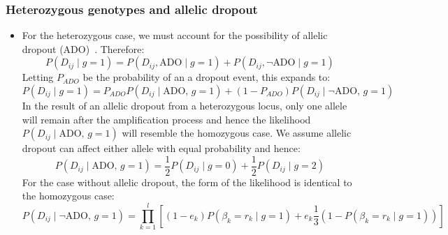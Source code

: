 \documentclass[../../main.tex]{subfiles}
\begin{document}
\subsubsection*{Heterozygous genotypes and allelic dropout}
\begin{itemize}
     \item For the heterozygous case, we must account for the possibility of allelic dropout (ADO)~\cite{monovar,sciphi}. Therefore:
     \begin{equation*}
         P(D_{ij}\mid g=1) = P(D_{ij}, \text{ADO} \mid g=1)+ P(D_{ij}, \neg \text{ADO}\mid g=1)
     \end{equation*}
     Letting $P_{ADO}$ be the probability of an a dropout event, this expands to:
     \begin{equation*}
         P(D_{ij}\mid g=1) = P_{ADO}P(D_{ij}\mid \text{ADO},\, g=1) + (1-P_{ADO})P(D_{ij} \mid \neg \text{ADO},\, g=1)
     \end{equation*}
     In the result of an allelic dropout from a heterozygous locus, only one allele will remain after the amplification process and hence the likelihood $P(D_{ij}\mid \text{ADO},\, g=1)$ will resemble the homozygous case. We assume allelic dropout can affect either  allele with equal probability and hence:
     \begin{equation*}
         P(D_{ij}\mid \text{ADO},\, g=1) =\frac{1}{2}P(D_{ij}\mid g=0) + \frac{1}{2}P(D_{ij}\mid g=2)
     \end{equation*}
     For the case without allelic dropout, the form of the likelihood is identical to the homozygous case:
     \begin{equation*}
           P(D_{ij}\mid \neg\text{ADO},\,g=1) = \prod_{k=1}^l \left[ (1-e_k)P(\beta_k=r_k\mid g=1) + e_k \frac{1}{3} (1-P(\beta_k=r_k\mid g=1)) \right]
     \end{equation*}
\end{itemize}
\end{document}

